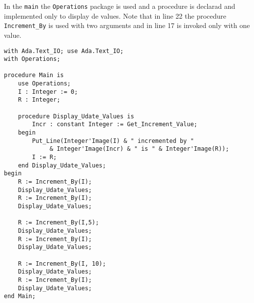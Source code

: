 \documentclass[paper=a4, fontsize=11pt]{scrartcl} %
\numberwithin{equation}{section} %
\numberwithin{figure}{section} %
\numberwithin{table}{section} %
\begin{document}
In the \verb|main| the \verb|Operations| package is used and a procedure is declarad and implemented only to display de values. Note that in line 22 the procedure \verb|Increment_By| is used with two arguments and in line 17 is invoked only with one value. 

\begin{lstlisting}[caption = {operations.adb}]
with Ada.Text_IO; use Ada.Text_IO;
with Operations;

procedure Main is
	use Operations;
	I : Integer := 0;
	R : Integer;

	procedure Display_Udate_Values is
		Incr : constant Integer := Get_Increment_Value;
	begin  
		Put_Line(Integer'Image(I) & " incremented by "
			 & Integer'Image(Incr) & " is " & Integer'Image(R));
		I := R;
	end Display_Udate_Values;
begin 
	R := Increment_By(I);
	Display_Udate_Values;
	R := Increment_By(I);
	Display_Udate_Values;

	R := Increment_By(I,5);
	Display_Udate_Values;
	R := Increment_By(I);
	Display_Udate_Values;

	R := Increment_By(I, 10);
	Display_Udate_Values;
	R := Increment_By(I);
	Display_Udate_Values;
end Main;
\end{lstlisting}
\end{document}
